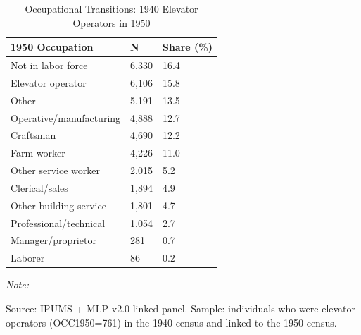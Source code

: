 \begin{table}[!h]
\centering
\caption{Occupational Transitions: 1940 Elevator Operators in 1950}
\centering
\begin{threeparttable}
\begin{tabular}[t]{lll}
\toprule
1950 Occupation & N & Share (\%)\\
\midrule
Not in labor force & 6,330 & 16.4\\
Elevator operator & 6,106 & 15.8\\
Other & 5,191 & 13.5\\
Operative/manufacturing & 4,888 & 12.7\\
Craftsman & 4,690 & 12.2\\
\addlinespace
Farm worker & 4,226 & 11.0\\
Other service worker & 2,015 & 5.2\\
Clerical/sales & 1,894 & 4.9\\
Other building service & 1,801 & 4.7\\
Professional/technical & 1,054 & 2.7\\
\addlinespace
Manager/proprietor & 281 & 0.7\\
Laborer & 86 & 0.2\\
\bottomrule
\end{tabular}
\begin{tablenotes}
\item \textit{Note: } 
\item Source: IPUMS + MLP v2.0 linked panel. Sample: individuals who were elevator operators (OCC1950=761) in the 1940 census and linked to the 1950 census.
\end{tablenotes}
\end{threeparttable}
\end{table}
